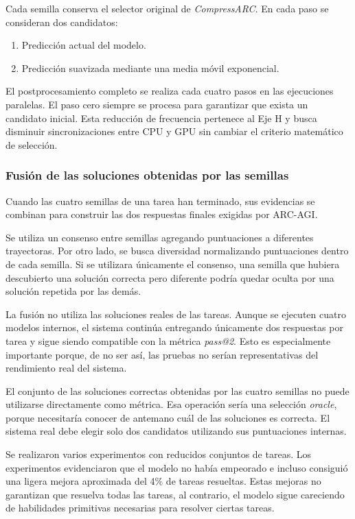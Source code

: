 \documentclass[11pt,a4paper,spanish]{book}
\numberwithin{equation}{chapter}
\numberwithin{figure}{chapter}
\begin{document}
Cada semilla conserva el selector original de \textit{CompressARC}. En cada
paso se consideran dos candidatos:

\begin{enumerate}
    \item Predicción actual del modelo.
    \item Predicción suavizada mediante una media móvil exponencial.
\end{enumerate}

El postprocesamiento completo se realiza cada cuatro pasos en las ejecuciones
paralelas. El paso cero siempre se procesa para garantizar que exista un
candidato inicial. Esta reducción de frecuencia pertenece al Eje H y busca
disminuir sincronizaciones entre CPU y GPU sin cambiar el criterio matemático de selección.

\subsubsection{Fusión de las soluciones obtenidas por las semillas}

Cuando las cuatro semillas de una tarea han terminado, sus evidencias se
combinan para construir las dos respuestas finales exigidas por ARC-AGI.

Se utiliza un consenso entre semillas agregando puntuaciones a diferentes trayectoras.
Por otro lado, se busca diversidad normalizando puntuaciones dentro de cada semilla. Si se utilizara 
únicamente el consenso, una semilla que hubiera descubierto una solución correcta pero diferente
podría quedar oculta por una solución repetida por las demás.

La fusión no utiliza las soluciones reales de las tareas. Aunque se ejecuten cuatro modelos internos,
el sistema continúa entregando únicamente dos respuestas por tarea y sigue siendo
compatible con la métrica \textit{pass@2}. Esto es especialmente importante porque, de no ser así,
las pruebas no serían representativas del rendimiento real del sistema.

El conjunto de las soluciones correctas obtenidas por las cuatro semillas no
puede utilizarse directamente como métrica. Esa operación sería una selección
\textit{oracle}, porque necesitaría conocer de antemano cuál de las soluciones
es correcta. El sistema real debe elegir solo dos candidatos utilizando sus
puntuaciones internas.

Se realizaron varios experimentos con reducidos conjuntos de tareas. Los experimentos evidenciaron
que el modelo no había empeorado e incluso consiguió una ligera mejora aproximada del 4\% de tareas
resueltas. Estas mejoras no garantizan que resuelva todas las tareas, al contrario, el modelo
sigue careciendo de habilidades primitivas necesarias para resolver ciertas tareas.
\end{document}
